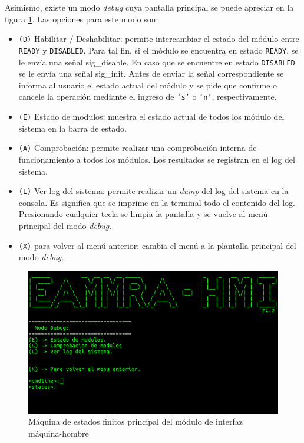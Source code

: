 Asimismo, existe un modo \textit{debug} cuya pantalla principal se puede apreciar en la figura \ref{fig:interfaz_debug}.  Las opciones para este modo son:

\begin{itemize}
  \item \texttt{(D)} Habilitar / Deshabilitar: permite intercambiar el estado del módulo entre \texttt{READY} y \texttt{DISABLED}.  Para tal fin, si el módulo se encuentra en estado \texttt{READY}, se le envía una señal sig\_disable.  En caso que se encuentre en estado \texttt{DISABLED} se le envía una señal sig\_init.  Antes de enviar la señal correspondiente se informa al usuario el estado actual del módulo y se pide que confirme o cancele la operación mediante el ingreso de \texttt{`s'} o \texttt{`n'}, respectivamente.
  \item \texttt{(E)} Estado de modulos: muestra el estado actual de todos los módulo del sistema en la barra de estado.
  \item \texttt{(A)} Comprobación: permite realizar una comprobación interna de funcionamiento a todos los módulos. Los resultados se registran en el log del sistema.
  \item \texttt{(L)} Ver log del sistema: permite realizar un \textit{dump} del log del sistema en la consola.  Es significa que se imprime en la terminal todo el contenido del log. Presionando cualquier tecla se limpia la pantalla y se vuelve al menú principal del modo \textit{debug}.
  \item \texttt{(X)} para volver al menú anterior: cambia el menú a la plantalla principal del modo \textit{debug}.
\end{itemize}

\begin{figure}[htpb]
	\centering
	\includegraphics[width=\textwidth]{./Figures/interfaz_debug.png}
	\caption[MEF principal del módulo de HMI]{Máquina de estados finitos principal del módulo de interfaz máquina-hombre}
	\label{fig:interfaz_debug}
\end{figure}

